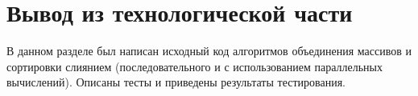 \section*{Вывод из технологической части}

В данном разделе был написан исходный код алгоритмов объединения массивов и сортировки слиянием (последовательного и с использованием параллельных вычислений). 
Описаны тесты и приведены результаты тестирования.
